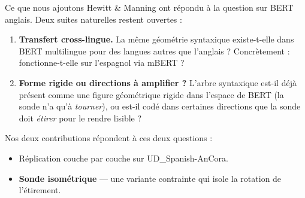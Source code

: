 \documentclass[aspectratio=169,11pt]{beamer}
\newcommand{\ancora}{UD\_Spanish-AnCora\xspace}
\begin{document}
\begin{frame}{Ce que nous ajoutons}
  Hewitt \& Manning ont répondu à la question sur \alert{BERT anglais}.
  Deux suites naturelles restent ouvertes :

  \vspace{0.4cm}
  \begin{enumerate}\setlength\itemsep{8pt}
    \item \textbf{Transfert cross-lingue.} La même géométrie syntaxique
          existe-t-elle dans \alert{BERT multilingue} pour des langues
          autres que l'anglais ? Concrètement : fonctionne-t-elle sur
          \alert{l'espagnol} via mBERT ?
    \item \textbf{Forme rigide ou directions à amplifier ?} L'arbre
          syntaxique est-il déjà présent comme une \alert{figure
          géométrique rigide} dans l'espace de BERT (la sonde n'a qu'à
          \emph{tourner}), ou est-il codé dans \alert{certaines
          directions} que la sonde doit \emph{étirer} pour le rendre
          lisible ?
  \end{enumerate}

  \vspace{0.5cm}
  Nos deux contributions répondent à ces deux questions :
  \begin{itemize}
    \item Réplication couche par couche sur \ancora.
    \item \textbf{Sonde isométrique} --- une variante contrainte qui
          isole la rotation de l'étirement.
  \end{itemize}
\end{frame}
\end{document}
